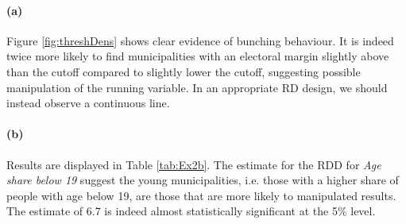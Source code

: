 \documentclass{scrartcl}
\begin{document}
\paragraph*{(a)}
Figure \ref{fig:threshDens} shows clear evidence of bunching behaviour. It is indeed twice more likely to find municipalities with an electoral margin slightly above than the cutoff compared to slightly lower the cutoff, suggesting possible manipulation of the running variable. In an appropriate RD design, we should instead observe a continuous line. 

\paragraph*{(b)}
Results are displayed in Table \ref{tab:Ex2b}. The estimate for the RDD for \textit{Age share below 19} suggest the young municipalities, i.e. those with a higher share of people with age below 19, are those that are more likely to manipulated results. The estimate of 6.7 is indeed almost statistically significant at the 5\% level.   
\end{document}
